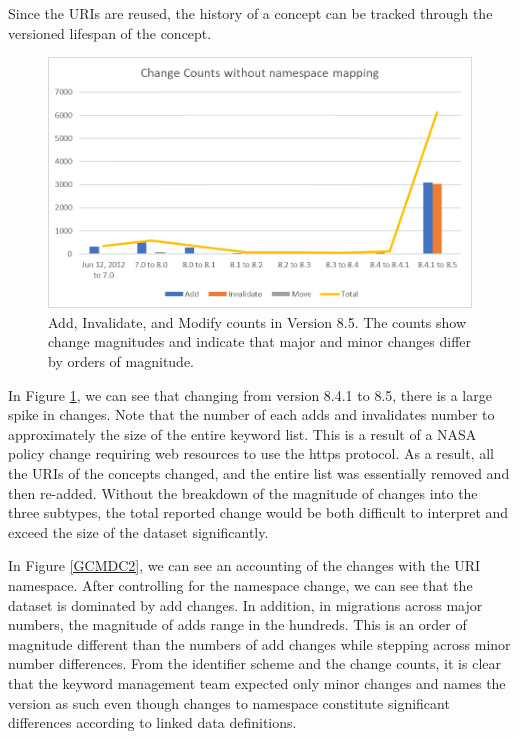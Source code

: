 Since the URIs are reused, the history of a concept can be tracked through the versioned lifespan of the concept.

\begin{figure}%
	\centering
	\includegraphics[scale=1]{figures/GCMDChart1.png}
	\caption{Add, Invalidate, and Modify counts in Version 8.5.  The counts show change magnitudes and indicate that major and minor changes differ by orders of magnitude.}
	\label{GCMDC1}
\end{figure}

In Figure \ref{GCMDC1}, we can see that changing from version 8.4.1 to 8.5, there is a large spike in changes.  Note that the number of each adds and invalidates number to approximately the size of the entire keyword list.  This is a result of a NASA policy change requiring web resources to use the https protocol.  As a result, all the URIs of the concepts changed, and the entire list was essentially removed and then re-added.  Without the breakdown of the magnitude of changes into the three subtypes, the total reported change would be both difficult to interpret and exceed the size of the dataset significantly.

In Figure \ref{GCMDC2}, we can see an accounting of the changes with the URI namespace.  After controlling for the namespace change, we can see that the dataset is dominated by add changes.  In addition, in migrations across major numbers, the magnitude of adds range in the hundreds.  This is an order of magnitude different than the numbers of add changes while stepping across minor number differences.  From the identifier scheme and the change counts, it is clear that the keyword management team expected only minor changes and names the version as such even though changes to namespace constitute significant differences according to linked data definitions.

